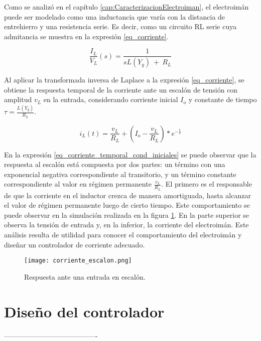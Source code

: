 Como se analizó en el capítulo \ref{cap:CaracterizacionElectroiman}, el electroimán puede ser modelado como una inductancia que varía con la distancia de entrehierro y una resistencia serie. Es decir, como un circuito RL serie cuya admitancia se muestra en la expresión \ref{eq_corriente}.

\begin{equation} \label{eq_corriente}
\frac{I_L}{V_L}(s)=\frac{1}{sL(Y_g)\ +\ R_L}
\end{equation}

Al aplicar la transformada inversa de Laplace a la expresión  \ref{eq_corriente}, se obtiene la respuesta temporal de la corriente ante un escalón de tensión con amplitud $v_L$ en la entrada, considerando corriente inicial $I_o$ y constante de tiempo $\tau=\frac{L(Y_g)}{R_L}$.

\begin{equation} \label{eq_corriente_temporal_cond_iniciales}
	i_L(t)=\frac{v_L}{R_L} + (I_o-\frac{v_L}{R_L})*e^{-\frac{t}{\tau}}
\end{equation}

En la expresión \ref{eq_corriente_temporal_cond_iniciales} se puede observar que la respuesta al escalón está compuesta por dos partes: un término con una exponencial negativa correspondiente al transitorio, y un término constante correspondiente al valor en régimen permanente $\frac{v_L}{R_L}$. El primero es el responsable de que la corriente en el inductor crezca de manera amortiguada, hasta alcanzar el valor de régimen permanente luego de cierto tiempo. Este comportamiento se puede observar en la simulación realizada en la figura \ref{fig:img_respuesta_escalon}. En la parte superior se observa la tensión de entrada y, en la inferior, la corriente del electroimán. Este análisis resulta de utilidad para conocer el comportamiento del electroimán y diseñar un controlador de corriente adecuado.


\begin{figure}[H]
	\centering
	\texttt{[image: corriente\_escalon.png]}
	\caption{Respuesta ante una entrada en escalón.}
	\label{fig:img_respuesta_escalon}
\end{figure}


\section{Diseño del controlador}




----------------------------------------

